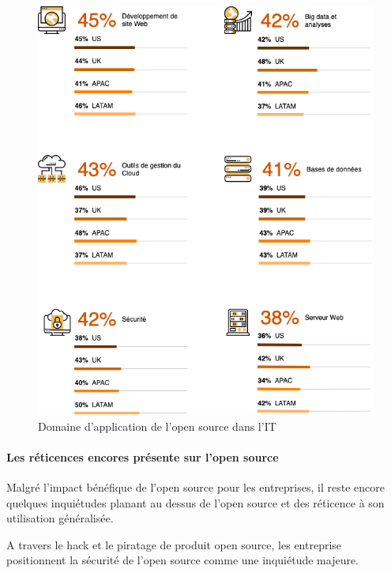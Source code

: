					\begin{figure}[h]
						\center
						\includegraphics[scale=0.65]{./img/Domain_os.png}
						\caption{Domaine d'application de l'open source dans l'IT}					
					\end{figure}
					\clearpage


				\paragraph{Les réticences encores présente sur l'open source\\}

					Malgré l'impact bénéfique de l'open source pour les entreprises, il reste encore quelques inquiétudes planant au dessus de l'open source et des réticence à son utilisation généralisée.

					A travers le hack et le piratage de produit open source, les entreprise positionnent la sécurité de l'open source comme une inquiétude majeure.

